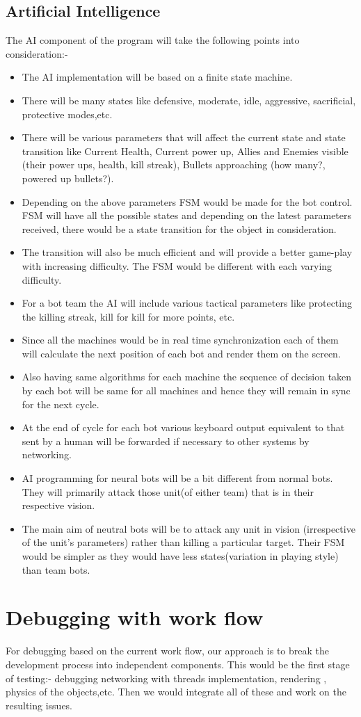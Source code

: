 \documentclass[ebook,12pt,oneside,openany]{article}
\begin{document}
\subsection{Artificial Intelligence}
The AI component of the program will take the following points into consideration:-\\
\begin{itemize}
\item The AI implementation will be based on a finite state machine.
\item There will be many states like defensive, moderate, idle, aggressive, sacrificial, protective modes,etc. 
\item There will be various parameters that will affect the current state and state transition like Current Health, Current power up, Allies and Enemies visible (their power ups, health, kill streak), Bullets approaching (how many?, powered up bullets?).
\item Depending on the above parameters FSM would be made for the bot control. FSM will have all the possible states and depending on the latest parameters received, there would be a state transition for the object in consideration.
\item The transition will also be much efficient and will provide a better game-play with increasing difficulty. The FSM would be different with each varying difficulty.
\item For a bot team the AI will include various tactical parameters like protecting the killing streak, kill for kill for more points, etc.
\item Since all the machines would be in real time synchronization each of them will calculate the next position of each bot and render them on the screen.
\item Also having same algorithms for each machine the sequence of decision taken by each bot will be same for all machines and hence they will remain in sync for the next cycle.
\item At the end of cycle for each bot various keyboard output equivalent to that sent by a human will be forwarded if necessary to other systems by networking.
\item AI programming for neural bots will be a bit different from normal bots. They will primarily attack those unit(of either team) that is in their respective vision.
\item The main aim of neutral bots will be to attack any unit in vision (irrespective of the unit's parameters) rather than killing a particular target. Their FSM would be simpler as they would have less states(variation in playing style) than team bots.
\end{itemize}


\section{Debugging with work flow}

For debugging based on the current work flow, our approach is to break the development process into independent components. This would be the first stage of testing:-
debugging networking with threads implementation, rendering , physics of the objects,etc. Then we would integrate all of these and work on the resulting issues.  
\end{document}
